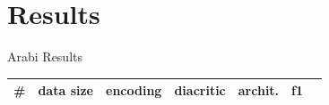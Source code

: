 \documentclass[10pt]{beamer}
\begin{document}
\section{Results}  

\begin{frame}[fragile]{Arabi Results}
\begin{center}
 \begin{tabular}{c c c c c c c}
     \toprule
     \small{\#                    }& 
     \small{data size    }& 
     \small{encoding     }&
     \small{diacritic    }&
     \small{archit.      }&
     \small{f1           }     \\
     \midrule



\end{tabular}
\end{center}
\end{frame}
\end{document}
